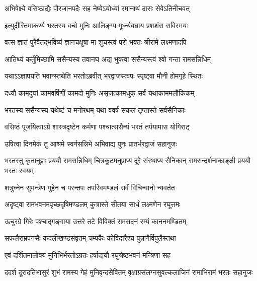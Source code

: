 \twolineshloka
{अभिषेक्ष्ये वसिष्ठाद्यैः पौरजानपदैः सह}
{नेष्येऽयोध्यां रमानाथं दासः सेवेऽतिनीचवत्} %

\twolineshloka
{इत्युदीरितमाकर्ण्य भरतस्य वचो मुनिः}
{आलिङ्ग्य मूर्ध्न्यवघ्राय प्रशशंस सविस्मयः} %

\twolineshloka
{वत्स ज्ञातं पुरैवैतद्भविष्यं ज्ञानचक्षुषा}
{मा शुचस्त्वं परो भक्तः श्रीरामे लक्ष्मणादपि} %

\twolineshloka
{आतिथ्यं कर्तुमिच्छामि ससैन्यस्य तवानघ}
{अद्य भुक्त्वा ससैन्यस्त्वं श्वो गन्ता रामसन्निधिम्} %

\twolineshloka
{यथाऽऽज्ञापयति भवान्स्तथेति भरतोऽब्रवीत्}
{भरद्वाजस्त्वपः स्पृष्ट्वा मौनी होमगृहे स्थितः} %

\twolineshloka
{दध्यौ कामदुघां कामवर्षिणीं कामदो मुनिः}
{असृजत्कामधुक् सर्वं यथाकाममलौकिकम्} %

\twolineshloka
{भरतस्य ससैन्यस्य यथेष्टं च मनोरथम्}
{यथा ववर्ष सकलं तृप्तास्ते सर्वसैनिकाः} %

\twolineshloka
{वसिष्ठं पूजयित्वाऽग्रे शास्त्रदृष्टेन कर्मणा}
{पश्चात्ससैन्यं भरतं तर्पयामास योगिराट्} %

\twolineshloka
{उषित्वा दिनमेकं तु आश्रमे स्वर्गसन्निभे}
{अभिवाद्य पुनः प्रातर्भरद्वाजं सहानुजः} %

\threelineshloka
{भरतस्तु कृतानुज्ञः प्रययौ रामसन्निधिम्}
{चित्रकूटमनुप्राप्य दूरे संस्थाप्य सैनिकान्}
{रामसन्दर्शनाकाङ्क्षी प्रययौ भरतः स्वयम्} %

\twolineshloka
{शत्रुघ्नेन सुमन्त्रेण गुहेन च परन्तपः}
{तपस्विमण्डलं सर्वं विचिन्वानो न्यवर्तत} %

\twolineshloka
{अदृष्ट्वा रामभवनमपृच्छदृषिमण्डलम्}
{कुत्रास्ते सीतया सार्धं लक्ष्मणेन रघूत्तमः} %

\twolineshloka
{ऊचुरग्रे गिरेः पश्चाद्गङ्गाया उत्तरे तटे}
{विविक्तं रामसदनं रम्यं काननमण्डितम्} %

\twolineshloka
{सफलैराम्रपनसैः कदलीखण्डसंवृतम्}
{चम्पकैः कोविदारैश्च पुन्नागैर्विपुलैस्तथा} %

\twolineshloka
{एवं दर्शितमालोक्य मुनिभिर्भरतोऽग्रतः}
{हर्षाद्ययौ रघुश्रेष्ठभवनं मन्त्रिणा सह} %

\fourlineindentedshloka
{ददर्श दूरादतिभासुरं शुभं}
{रामस्य गेहं मुनिवृन्दसेवितम्}
{वृक्षाग्रसंलग्नसुवल्कलाजिनं}
{रामाभिरामं भरतः सहानुजः} %





